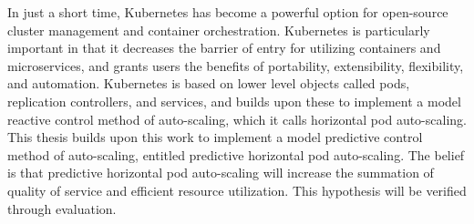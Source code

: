 In just a short time, Kubernetes has become a powerful option for open-source
cluster management and container orchestration. Kubernetes is particularly
important in that it decreases the barrier of entry for utilizing containers and
microservices, and grants users the benefits of portability, extensibility, flexibility, and
automation. Kubernetes is based on lower level objects called pods, replication
controllers, and services, and builds upon these to implement a model reactive
control method of auto-scaling, which it calls horizontal pod auto-scaling. This
thesis builds upon this work to implement a model predictive control method of
auto-scaling, entitled predictive horizontal pod auto-scaling. The belief is
that predictive horizontal pod auto-scaling will increase the summation of
quality of service and efficient resource utilization. This hypothesis will be
verified through evaluation.
